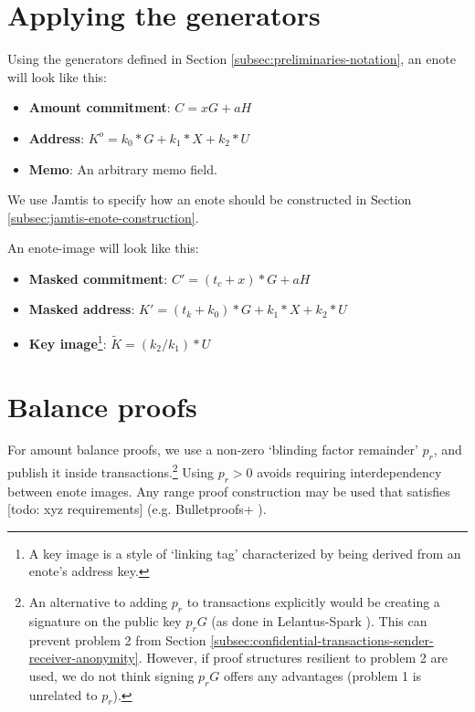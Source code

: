 \section{Applying the generators}
\label{sec:applying-generators}

Using the generators defined in Section \ref{subsec:preliminaries-notation}, an enote will look like this:

\begin{itemize}
    \item \textbf{Amount commitment}: $C = x G + a H$
    \item \textbf{Address}: $K^o = k_0*G + k_1*X + k_2*U$
    \item \textbf{Memo}: An arbitrary memo field.
\end{itemize}

We use Jamtis to specify how an enote should be constructed in Section \ref{subsec:jamtis-enote-construction}.

An enote-image will look like this:

\begin{itemize}
    \item \textbf{Masked commitment}: $C' = (t_c + x)*G + a H$
    \item \textbf{Masked address}: $K' = (t_k + k_0)*G + k_1*X + k_2*U$
    \item \textbf{Key image}\footnote{A key image is a style of `linking tag' characterized by being derived from an enote's address key.}: $\tilde{K} = (k_2/k_1)*U$
\end{itemize}



\section{Balance proofs}
\label{sec:balance-proofs}

For amount balance proofs, we use a non-zero `blinding factor remainder' $p_r$, and publish it inside transactions.\footnote{An alternative to adding $p_r$ to transactions explicitly would be creating a signature on the public key $p_r G$ (as done in Lelantus-Spark \cite{lelantus-spark}). This can prevent problem 2 from Section \ref{subsec:confidential-transactions-sender-receiver-anonymity}. However, if proof structures resilient to problem 2 are used, we do not think signing $p_r G$ offers any advantages (problem 1 is unrelated to $p_r$).} Using $p_r > 0$ avoids requiring interdependency between enote images. Any range proof construction may be used that satisfies [todo: xyz requirements] (e.g. Bulletproofs+ \cite{bulletproofs_plus}).

